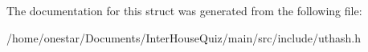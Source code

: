 The documentation for this struct was generated from the following file\+:\begin{DoxyCompactItemize}
\item 
/home/onestar/\+Documents/\+Inter\+House\+Quiz/main/src/include/uthash.\+h\end{DoxyCompactItemize}
